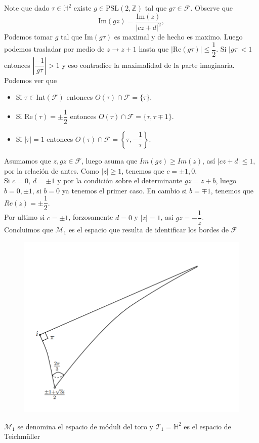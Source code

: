 \documentclass[xcolor=dvipsnames,10pt]{beamer}
\newcommand\Z{\ensuremath{\mathbb{Z}}}
\newcommand\Hs{\ensuremath{\mathbb{H}}}
\begin{document}
\begin{frame}
    Note que dado $\tau\in\Hs^2$ existe $g\in \text{PSL}(2,\Z)$ tal que $g\tau\in\mathcal{F}.$ Observe que
    $$\text{Im}(gz)=\frac{\text{Im}(z)}{|cz+d|^2},$$
    Podemos tomar $g$ tal que $\text{Im}(g\tau)$ es maximal y de hecho es maximo. Luego podemos trasladar por medio de $z\to z+1$ hasta que $|\text{Re}(g\tau)|\leq \dfrac{1}{2}.$ Si $|g\tau|<1$ entonces $\left|\dfrac{-1}{g\tau}\right|>1$ y eso contradice la maximalidad de la parte imaginaria.\\
    \vspace{0.2cm}
    Podemos ver que
    \begin{itemize}
        \item Si $\tau\in \text{Int}(\mathcal{F})$ entonces $O(\tau)\cap\mathcal{F}=\{\tau\}.$ 
        \item Si $\text{Re}(\tau)=\pm\dfrac{1}{2}$ entonces $O(\tau)\cap\mathcal{F}=\{\tau,\tau\mp1\}.$
        \item Si $|\tau|=1$ entonces $O(\tau)\cap \mathcal{F}=\left\{\tau,-\dfrac{1}{\tau}\right\}.$
    \end{itemize}
    
\end{frame}
\begin{frame}
    Asumamos que $z,gz\in\mathcal{F}$, luego asuma que $Im(gz)\geq Im(z)$, así $|cz+d|\leq 1,$ por la relación de antes. Como $|z|\geq 1$, tenemos que $c=\pm1,0.$\\

    Si $c=0$, $d=\pm 1$ y por la condición sobre el determinante $gz=z+b$, luego $b=0,\pm 1$, si $b=0$ ya tenemos el primer caso. En cambio si $b=\mp 1$, tenemos que $Re(z)=\pm\dfrac{1}{2}.$\\

    Por ultimo si $c=\pm 1$, forzosamente $d=0$ y $|z|=1$, asi $gz=-\dfrac{1}{z}.$\\

    Concluimos que $\mathcal{M}_1$ es el espacio que resulta de identificar los bordes de $\mathcal{F}$
    \begin{figure}
            \centering
            \includegraphics[width=0.5\linewidth]{Imagenes/Empanada.png}
        \end{figure} 

    $\mathcal{M}_1$ se denomina el espacio de móduli del toro y $\mathcal{T}_1 = \Hs^2 $ es el espacio de Teichmüller
\end{frame}
\end{document}
